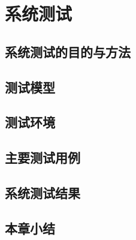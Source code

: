 
\chapter{系统测试}
\section{系统测试的目的与方法}
\section{测试模型}
\section{测试环境}
\section{主要测试用例}
\section{系统测试结果}
\section{本章小结}